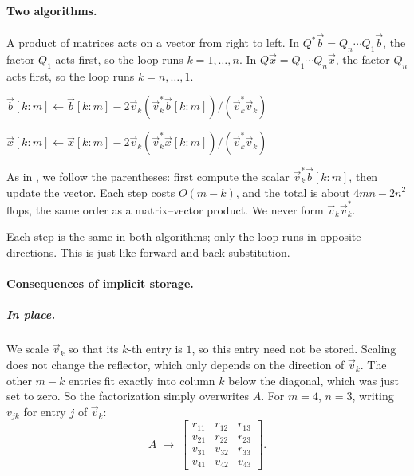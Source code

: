\paragraph{Two algorithms.} A product of matrices acts on a vector from right to left. In $Q^\ast\vec{b} = Q_n \cdots Q_1\vec{b}$, the factor $Q_1$ acts first, so the loop runs $k = 1, \dots, n$. In $Q\vec{x} = Q_1 \cdots Q_n\vec{x}$, the factor $Q_n$ acts first, so the loop runs $k = n, \dots, 1$.

\begin{algorithm}[H]
  \caption{Implicit computation of $Q^\ast\vec{b}$.}
  \label{alg:qtb}
  \begin{algorithmic}[1]
      \State $\vec{b}[k{:}m] \gets \vec{b}[k{:}m] - 2\vec{v}_k\left(\vec{v}_k^\ast\vec{b}[k{:}m]\right)/(\vec{v}_k^\ast\vec{v}_k)$
    \EndFor
  \end{algorithmic}
\end{algorithm}

\begin{algorithm}[H]
  \caption{Implicit computation of $Q\vec{x}$.}
  \label{alg:qx}
  \begin{algorithmic}[1]
      \State $\vec{x}[k{:}m] \gets \vec{x}[k{:}m] - 2\vec{v}_k\left(\vec{v}_k^\ast\vec{x}[k{:}m]\right)/(\vec{v}_k^\ast\vec{v}_k)$
    \EndFor
  \end{algorithmic}
\end{algorithm}

As in , we follow the parentheses: first compute the scalar $\vec{v}_k^\ast\vec{b}[k{:}m]$, then update the vector. Each step costs $O(m - k)$, and the total is about $4mn - 2n^2$ flops, the same order as a matrix--vector product. We never form $\vec{v}_k\vec{v}_k^\ast$.

Each step is the same in both algorithms; only the loop runs in opposite directions. This is just like forward and back substitution.

\paragraph{Consequences of implicit storage.}
\subparagraph{In place.} We scale $\vec{v}_k$ so that its $k$-th entry is $1$, so this entry need not be stored. Scaling does not change the reflector, which only depends on the direction of $\vec{v}_k$. The other $m - k$ entries fit exactly into column $k$ below the diagonal, which was just set to zero. So the factorization simply overwrites $A$. For $m = 4$, $n = 3$, writing $v_{jk}$ for entry $j$ of $\vec{v}_k$:
\begin{equation}
  A \;\to\; \begin{bmatrix}
    r_{11} & r_{12} & r_{13} \\
    v_{21} & r_{22} & r_{23} \\
    v_{31} & v_{32} & r_{33} \\
    v_{41} & v_{42} & v_{43}
  \end{bmatrix}.
\end{equation}

